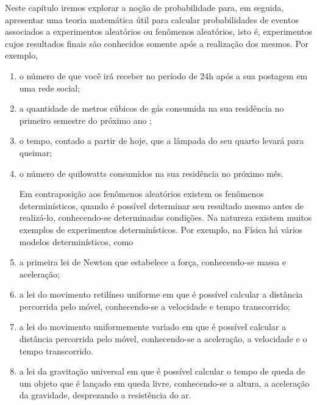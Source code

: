 \label{\detokenize{PE511-0::doc}}\label{\detokenize{PE511-0:explorando-probabilidade-conceitos-basicos}}\label{\detokenize{PE511-0:sec-conceitos-basicos}}
Neste capítulo iremos explorar a noção de probabilidade para, em seguida,  apresentar uma teoria matemática útil para calcular probabilidades de eventos associados a experimentos aleatórios ou fenômenos aleatórios, isto é, experimentos cujos resultados finais são conhecidos somente após a realização dos mesmos.
Por exemplo,
\begin{enumerate}
\item {} 
o número de  que você irá receber no período de 24h após a sua postagem em uma rede social;

\item {} 
a quantidade de metros cúbicos de gás consumida na sua residência no primeiro semestre do próximo ano ;

\item {} 
o tempo, contado a partir de hoje, que a lâmpada do seu quarto levará para queimar;

\item {} 
o número de quilowatts consumidos na sua residência no próximo mês.

Em contraposição aos fenômenos aleatórios existem os fenômenos determinísticos, quando é possível determinar seu resultado mesmo antes de realizá-lo, conhecendo-se determinadas condições. Na natureza existem muitos exemplos de experimentos determinísticos. Por exemplo, na Física há vários modelos determinísticos, como

\item {} 
a primeira lei de Newton que estabelece a força, conhecendo-se massa e aceleração;

\item {} 
a lei do movimento retilíneo uniforme em que é possível calcular a distância percorrida pelo móvel, conhecendo-se a velocidade e tempo transcorrido;

\item {} 
a lei do movimento uniformemente variado em que é possível calcular a distância percorrida pelo móvel, conhecendo-se a aceleração, a velocidade e o tempo transcorrido.

\item {} 
a lei da gravitação universal em que é possível calcular o tempo de queda de um objeto que é lançado em queda livre, conhecendo-se a altura, a aceleração da gravidade, desprezando a resistência do ar.

\end{enumerate}

